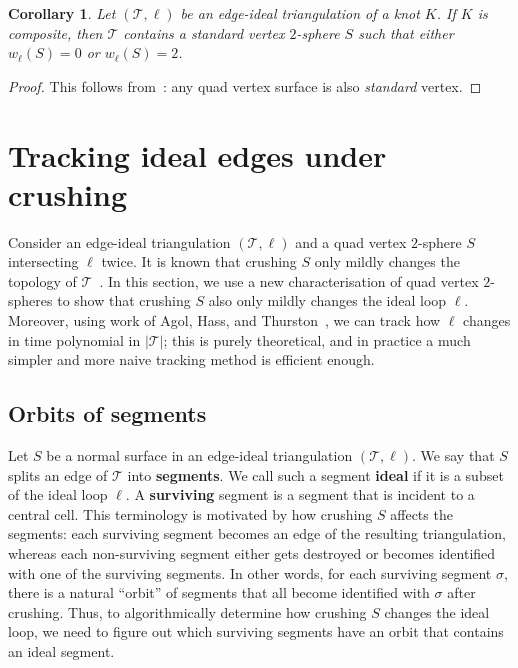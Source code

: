 \documentclass[10pt,a4paper]{amsart}
\newtheorem{corollary}[theorem]{Corollary}
\newcommand{\tri}{\mathcal{T}}
\begin{document}
\begin{corollary}
Let $(\tri,\ell)$ be an edge-ideal triangulation of a knot $K$.
If $K$ is composite, then $\tri$ contains a standard vertex $2$-sphere $S$ such that either $w_\ell(S)=0$ or $w_\ell(S)=2$.
\end{corollary}

\begin{proof}
This follows from~\cite[Lemma 4.5]{Burton09Converting}:
any quad vertex surface is also \emph{standard} vertex.
\end{proof}

\section{Tracking ideal edges under crushing}\label{sec:identifyingIdealEdges}

Consider an edge-ideal triangulation $(\tri,\ell)$ and a quad vertex $2$-sphere $S$ intersecting $\ell$ twice.
It is known that crushing $S$ only mildly changes the topology of $\tri$~\cite{burton2014crushing}.
In this section, we use a new characterisation of quad vertex $2$-spheres to show that crushing $S$ also only mildly changes the ideal loop $\ell$.
Moreover, using work of Agol, Hass, and Thurston~\cite[Sections 4 and 6]{agol2006computational}, we can track how $\ell$ changes in time polynomial in $|\tri|$;
this is purely theoretical, and in practice a much simpler and more naive tracking method is efficient enough.

\subsection{Orbits of segments}\label{ssec:orbitSegment}

Let $S$ be a normal surface in an edge-ideal triangulation $(\tri,\ell)$.
We say that $S$ splits an edge of $\tri$ into {\bf segments}.
We call such a segment \textbf{ideal} if it is a subset of the ideal loop $\ell$.
A \textbf{surviving} segment is a segment that is incident to a central cell.
This terminology is motivated by how crushing $S$ affects the segments:
each surviving segment becomes an edge of the resulting triangulation, whereas each non-surviving segment either gets destroyed or becomes identified with one of the surviving segments.
In other words, for each surviving segment $\sigma$, there is a natural ``orbit'' of segments that all become identified with $\sigma$ after crushing.
Thus, to algorithmically determine how crushing $S$ changes the ideal loop, we need to figure out which surviving segments have an orbit that contains an ideal segment.
\end{document}
